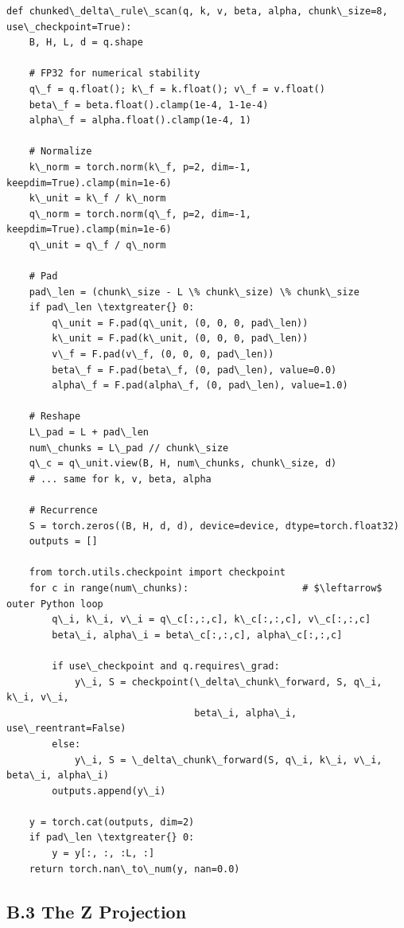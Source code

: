 \begin{lstlisting}
def chunked\_delta\_rule\_scan(q, k, v, beta, alpha, chunk\_size=8, use\_checkpoint=True):
    B, H, L, d = q.shape
    
    # FP32 for numerical stability
    q\_f = q.float(); k\_f = k.float(); v\_f = v.float()
    beta\_f = beta.float().clamp(1e-4, 1-1e-4)
    alpha\_f = alpha.float().clamp(1e-4, 1)
    
    # Normalize
    k\_norm = torch.norm(k\_f, p=2, dim=-1, keepdim=True).clamp(min=1e-6)
    k\_unit = k\_f / k\_norm
    q\_norm = torch.norm(q\_f, p=2, dim=-1, keepdim=True).clamp(min=1e-6)
    q\_unit = q\_f / q\_norm
    
    # Pad
    pad\_len = (chunk\_size - L \% chunk\_size) \% chunk\_size
    if pad\_len \textgreater{} 0:
        q\_unit = F.pad(q\_unit, (0, 0, 0, pad\_len))
        k\_unit = F.pad(k\_unit, (0, 0, 0, pad\_len))
        v\_f = F.pad(v\_f, (0, 0, 0, pad\_len))
        beta\_f = F.pad(beta\_f, (0, pad\_len), value=0.0)
        alpha\_f = F.pad(alpha\_f, (0, pad\_len), value=1.0)
    
    # Reshape
    L\_pad = L + pad\_len
    num\_chunks = L\_pad // chunk\_size
    q\_c = q\_unit.view(B, H, num\_chunks, chunk\_size, d)
    # ... same for k, v, beta, alpha
    
    # Recurrence
    S = torch.zeros((B, H, d, d), device=device, dtype=torch.float32)
    outputs = []
    
    from torch.utils.checkpoint import checkpoint
    for c in range(num\_chunks):                    # $\leftarrow$ outer Python loop
        q\_i, k\_i, v\_i = q\_c[:,:,c], k\_c[:,:,c], v\_c[:,:,c]
        beta\_i, alpha\_i = beta\_c[:,:,c], alpha\_c[:,:,c]
        
        if use\_checkpoint and q.requires\_grad:
            y\_i, S = checkpoint(\_delta\_chunk\_forward, S, q\_i, k\_i, v\_i, 
                                 beta\_i, alpha\_i, use\_reentrant=False)
        else:
            y\_i, S = \_delta\_chunk\_forward(S, q\_i, k\_i, v\_i, beta\_i, alpha\_i)
        outputs.append(y\_i)
    
    y = torch.cat(outputs, dim=2)
    if pad\_len \textgreater{} 0:
        y = y[:, :, :L, :]
    return torch.nan\_to\_num(y, nan=0.0)
\end{lstlisting}

\subsection{B.3 The Z Projection}

